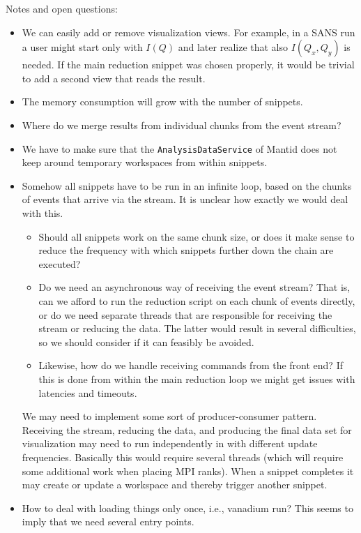 \documentclass[a4paper,english,numbers=noenddot,bibliography=totoc,chapterprefix=on,DIV=12]{scrartcl}
\begin{document}
Notes and open questions:
\begin{itemize}
  \item We can easily add or remove visualization views.
    For example, in a SANS run a user might start only with $I(Q)$ and later realize that also $I(Q_x,Q_y)$ is needed.
    If the main reduction snippet was chosen properly, it would be trivial to add a second view that reads the result.
  \item The memory consumption will grow with the number of snippets.
  \item Where do we merge results from individual chunks from the event stream?
  \item We have to make sure that the \texttt{AnalysisDataService} of Mantid does not keep around temporary workspaces from within snippets.
  \item Somehow all snippets have to be run in an infinite loop, based on the chunks of events that arrive via the stream.
    It is unclear how exactly we would deal with this.
    \begin{itemize}
      \item Should all snippets work on the same chunk size, or does it make sense to reduce the frequency with which snippets further down the chain are executed?
      \item Do we need an asynchronous way of receiving the event stream?
        That is, can we afford to run the reduction script on each chunk of events directly, or do we need separate threads that are responsible for receiving the stream or reducing the data.
        The latter would result in several difficulties, so we should consider if it can feasibly be avoided.
      \item Likewise, how do we handle receiving commands from the front end?
        If this is done from within the main reduction loop we might get issues with latencies and timeouts.
    \end{itemize}
    We may need to implement some sort of producer-consumer pattern.
    Receiving the stream, reducing the data, and producing the final data set for visualization may need to run independently in with different update frequencies.
    Basically this would require several threads (which will require some additional work when placing MPI ranks).
    When a snippet completes it may create or update a workspace and thereby trigger another snippet.
  \item How to deal with loading things only once, i.e., vanadium run?
    This seems to imply that we need several entry points.

\end{itemize}
\end{document}
